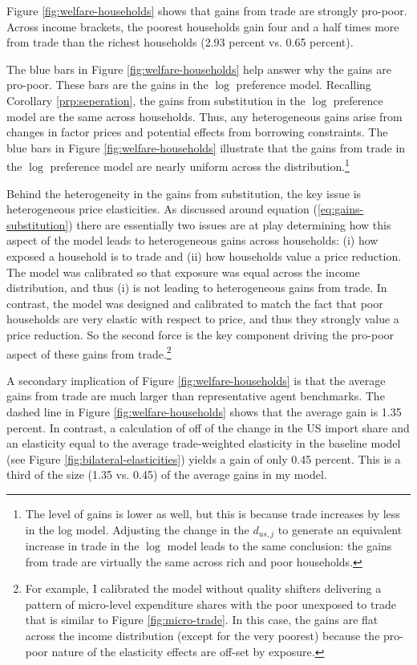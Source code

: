 \documentclass[12pt,pdftex]{article}
\begin{document}
\begin{onehalfspacing}
Figure \ref{fig:welfare-households} shows that gains from trade are strongly pro-poor. Across income brackets, the poorest households gain four and a half times more from trade than the richest households (2.93 percent vs. 0.65 percent).

The blue bars in Figure \ref{fig:welfare-households} help answer why the gains are pro-poor. These bars are the gains in the $\log$ preference model. Recalling Corollary \ref{prp:seperation}, the gains from substitution in the $\log$ preference model are the same across households. Thus, any heterogeneous gains arise from changes in factor prices and potential effects from borrowing constraints. The blue bars in Figure \ref{fig:welfare-households} illustrate that the gains from trade in the $\log$ preference model are nearly uniform across the distribution.\footnote{The level of gains is lower as well, but this is because trade increases by less in the log model. Adjusting the change in the $d_{us,j}$ to generate an equivalent increase in trade in the $\log$ model leads to the same conclusion: the gains from trade are virtually the same across rich and poor households.}

Behind the heterogeneity in the gains from substitution, the key issue is heterogeneous price elasticities. As discussed around equation (\ref{eq:gains-substitution}) there are essentially two issues are at play determining how this aspect of the model leads to heterogeneous gains across households: (i) how exposed a household is to trade and (ii) how households value a price reduction. The model was calibrated so that exposure was equal across the income distribution, and thus (i) is not leading to heterogeneous gains from trade.  In contrast, the model was designed and calibrated to match the fact that poor households are very elastic with respect to price, and thus they strongly value a price reduction. So the second force is the key component driving the pro-poor aspect of these gains from trade.\footnote{For example, I calibrated the model without quality shifters delivering a pattern of micro-level expenditure shares with the poor unexposed to trade that is similar to Figure \ref{fig:micro-trade}. In this case, the gains are flat across the income distribution (except for the very poorest) because the pro-poor nature of the elasticity effects are off-set by exposure.}

A secondary implication of Figure \ref{fig:welfare-households} is that the average gains from trade are much larger than representative agent benchmarks. The dashed line in Figure \ref{fig:welfare-households} shows that the average gain is 1.35 percent. In contrast, a calculation of \citet{arkolakis2012new} off of the change in the US import share and an elasticity equal to the average trade-weighted elasticity in the baseline model (see Figure \ref{fig:bilateral-elasticities}) yields a gain of only 0.45 percent. This is a third of the size (1.35 vs. 0.45) of the average gains in my model.


\end{onehalfspacing}
\end{document}
